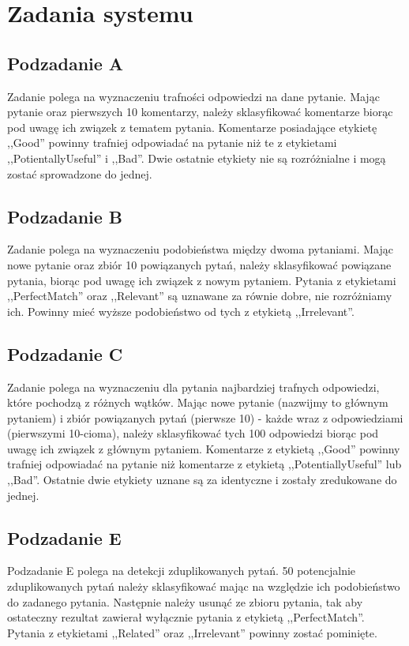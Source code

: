 \section{Zadania systemu}

\subsection{Podzadanie A}
Zadanie polega na wyznaczeniu trafności odpowiedzi na dane pytanie. Mając pytanie oraz pierwszych 10 komentarzy, należy sklasyfikować komentarze biorąc pod uwagę ich związek z tematem pytania. Komentarze posiadające etykietę ,,Good'' powinny trafniej odpowiadać na pytanie niż te z etykietami ,,PotientallyUseful'' i ,,Bad''. Dwie ostatnie etykiety nie są rozróżnialne i mogą zostać sprowadzone do jednej.

\subsection{Podzadanie B}
Zadanie polega na wyznaczeniu podobieństwa między dwoma pytaniami. Mając nowe pytanie oraz zbiór 10 powiązanych pytań, należy sklasyfikować powiązane pytania, biorąc pod uwagę ich związek z nowym pytaniem. Pytania z etykietami ,,PerfectMatch'' oraz ,,Relevant'' są uznawane za równie dobre, nie rozróżniamy ich. Powinny mieć wyższe podobieństwo od tych z etykietą ,,Irrelevant''.

\subsection{Podzadanie C}
Zadanie polega na wyznaczeniu dla pytania najbardziej trafnych odpowiedzi, które pochodzą z różnych wątków. Mając nowe pytanie (nazwijmy to głównym pytaniem) i zbiór powiązanych pytań (pierwsze 10) - każde  wraz z odpowiedziami (pierwszymi 10-cioma), należy sklasyfikować tych 100 odpowiedzi biorąc pod uwagę ich związek z głównym pytaniem. Komentarze z etykietą ,,Good'' powinny trafniej odpowiadać na pytanie niż komentarze z etykietą ,,PotentiallyUseful'' lub ,,Bad''. Ostatnie dwie etykiety uznane są za identyczne i zostały zredukowane do jednej.

\subsection{Podzadanie E}
Podzadanie E polega na detekcji zduplikowanych pytań. 50 potencjalnie zduplikowanych pytań należy sklasyfikować mając na względzie ich podobieństwo do zadanego pytania. Następnie należy usunąć ze zbioru pytania, tak aby ostateczny rezultat zawierał wyłącznie pytania z etykietą ,,PerfectMatch''. Pytania z etykietami ,,Related'' oraz ,,Irrelevant'' powinny zostać pominięte.
